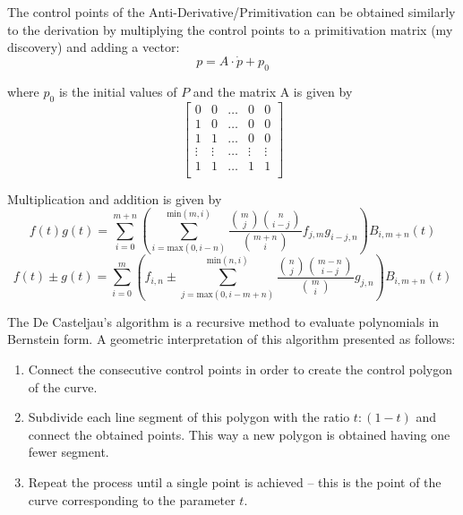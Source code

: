 \par The control points of the Anti-Derivative/Primitivation can be obtained similarly to the derivation by multiplying the control points to a primitivation matrix (my discovery) and adding a vector:
\begin{equation}
    p = A \cdot \dot{p}  + p_0
\end{equation}

where $p_0$ is the initial values of $P$ and the matrix A is given by 
\begin{equation}
    \begin{bmatrix}
        0 & 0 & \ldots & 0 & 0 \\
        1 & 0 & \ldots & 0 & 0 \\
        1 & 1 & \ldots & 0 & 0 \\
        \vdots & \vdots & \ldots & \vdots & \vdots \\
        1 & 1 & \ldots & 1 & 1 \\
    \end{bmatrix}
\end{equation}




\par Multiplication and addition is given by
\begin{equation}
    \label{eq:bern_mul}
    f(t)g(t) = \sum^{m+n}_{i=0}  \left(\sum_{i=\text{max}(0,i-n)}^{\text{min}(m,i)} \frac{\binom{m}{j}\binom{n}{i-j}}{\binom{m+n}{i}} f_{j,m}g_{i-j,n}\right) B_{i,m+n}(t)
\end{equation}
\begin{equation}
    \label{eq:bern_sum}
    f(t)\pm g(t) = 
    \sum^{m}_{i=0}  \left(f_{i,n} \pm \sum_{j=\text{max}(0,i-m+n)}^{\text{min}(n,i)} \frac{\binom{n}{j}\binom{m-n}{i-j}}{\binom{m}{i}} g_{j,n}\right) B_{i,m+n}(t)
\end{equation}

\par The De Casteljau's algorithm is a recursive method to evaluate polynomials in Bernstein form. A geometric interpretation of this algorithm presented as follows:
\begin{enumerate}
    \item Connect the consecutive control points in order to create the control polygon of the curve.
	\item Subdivide each line segment of this polygon with the ratio $t:(1-t)$ and connect the obtained points. This way a new polygon is obtained having one fewer segment.
    \item Repeat the process until a single point is achieved – this is the point of the curve corresponding to the parameter $t$.
\end{enumerate}
    
